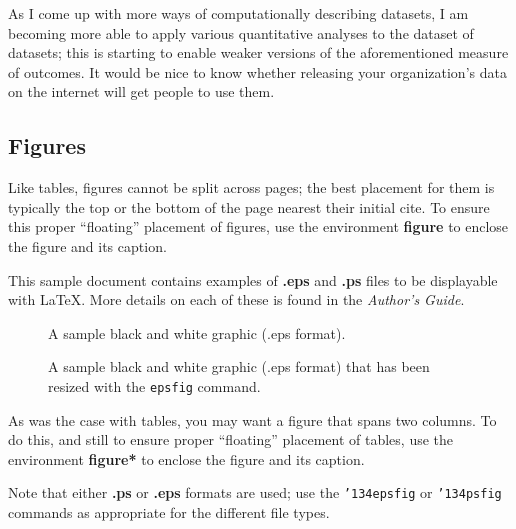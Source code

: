 \documentclass{acm_proc_article-sp}
\begin{document}
As I come up with more ways of computationally describing datasets, I am becoming
more able to apply various quantitative analyses to the dataset of datasets;
this is starting to enable weaker versions of the aforementioned measure of
outcomes. It would be nice to know whether releasing your organization's data on
the internet will get people to use them.

\subsection{Figures}
Like tables, figures cannot be split across pages; the
best placement for them
is typically the top or the bottom of the page nearest
their initial cite.  To ensure this proper ``floating'' placement
of figures, use the environment
\textbf{figure} to enclose the figure and its caption.

This sample document contains examples of \textbf{.eps}
and \textbf{.ps} files to be displayable with \LaTeX.  More
details on each of these is found in the \textit{Author's Guide}.

\begin{figure}
\centering
{}
\caption{A sample black and white graphic (.eps format).}
\end{figure}

\begin{figure}
\centering
{}
\caption{A sample black and white graphic (.eps format)
that has been resized with the \texttt{epsfig} command.}
\end{figure}


As was the case with tables, you may want a figure
that spans two columns.  To do this, and still to
ensure proper ``floating'' placement of tables, use the environment
\textbf{figure*} to enclose the figure and its caption.

Note that either {\textbf{.ps}} or {\textbf{.eps}} formats are
used; use
the \texttt{{\char'134}epsfig} or \texttt{{\char'134}psfig}
commands as appropriate for the different file types.



\balancecolumns
\end{document}
